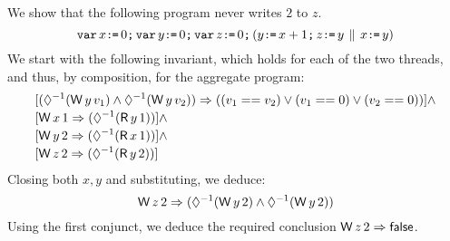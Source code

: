 \begin{example}
We show that the following program never writes $2$ to $z$. 
\begin{displaymath}
  \VAR x\GETS0\SEMI \VAR y\GETS0\SEMI \VAR z\GETS0\SEMI  %
  (
    y\GETS x+1\SEMI z \GETS y
  \PAR
    x\GETS y
  )
\end{displaymath}
We start with the following invariant, which holds for each of the two threads, and thus, by composition, for the aggregate program:
\begin{align*}
  &[(\once(\DW{y}{v_1}) \land \once(\DW{y}{v_2})) \Rightarrow ((v_1 == v_2) \vee (v_1 == 0) \vee (v_2 == 0))] \land\\[-.5ex]
  &[\DW{x}{1} \Rightarrow (\once(\DR{y}{1}))] \land \\[-.5ex]
  &[\DW{y}{2} \Rightarrow (\once(\DR{x}{1}))]  \land \\[-.5ex]
  &[\DW{z}{2} \Rightarrow (\once(\DR{y}{2}))]
\end{align*}
Closing both $x,y$ and substituting, we deduce:
\[ \DW{z}{2} \Rightarrow (\once(\DW{y}{2})  \land \once(\DW{y}{2})) \]
Using the first conjunct, we deduce the required conclusion $\DW{z}{2} \Rightarrow \FALSE$. 

\end{example}

\endinput

\begin{verbatim}



y=x+1; a=y || x=y
prove a!=2

Wyv_1 /\ Wyv_2 => v_1 == v_2 (and maybe v_1==0 \/ v_2==0)
Wx1 => <>-1 Ry1
Wy1 => <>-1 Rx1
\end{verbatim}


